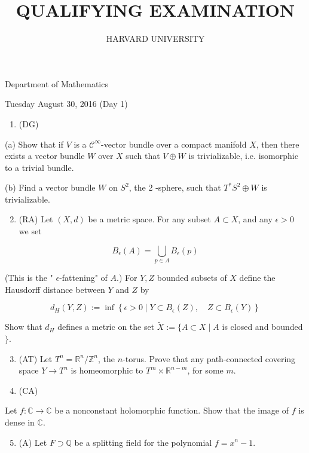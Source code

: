 \documentclass[10pt]{article}
\title{QUALIFYING EXAMINATION }
\author{HARVARD UNIVERSITY}
\date{}
\begin{document}
\maketitle
Department of Mathematics

Tuesday August 30, 2016 (Day 1)

\begin{enumerate}
  \item (DG)
\end{enumerate}

(a) Show that if $V$ is a $\mathcal{C}^{\infty}$-vector bundle over a compact manifold $X$, then there exists a vector bundle $W$ over $X$ such that $V \oplus W$ is trivializable, i.e. isomorphic to a trivial bundle.

(b) Find a vector bundle $W$ on $S^{2}$, the 2 -sphere, such that $T^{*} S^{2} \oplus W$ is trivializable.

\begin{enumerate}
  \setcounter{enumi}{1}
  \item (RA) Let $(X, d)$ be a metric space. For any subset $A \subset X$, and any $\epsilon>0$ we set
\end{enumerate}

$$
B_{\epsilon}(A)=\bigcup_{p \in A} B_{\epsilon}(p)
$$

(This is the " $\epsilon$-fattening" of $A$.) For $Y, Z$ bounded subsets of $X$ define the Hausdorff distance between $Y$ and $Z$ by

$$
d_{H}(Y, Z):=\inf \left\{\epsilon>0 \mid Y \subset B_{\epsilon}(Z), \quad Z \subset B_{\epsilon}(Y)\right\}
$$

Show that $d_{H}$ defines a metric on the set $\tilde{X}:=\{A \subset X \mid A$ is closed and bounded $\}$.

\begin{enumerate}
  \setcounter{enumi}{2}
  \item (AT) Let $T^{n}=\mathbb{R}^{n} / \mathbb{Z}^{n}$, the $n$-torus. Prove that any path-connected covering space $Y \rightarrow T^{n}$ is homeomorphic to $T^{m} \times \mathbb{R}^{n-m}$, for some $m$.

  \item (CA)

\end{enumerate}

Let $f: \mathbb{C} \rightarrow \mathbb{C}$ be a nonconstant holomorphic function. Show that the image of $f$ is dense in $\mathbb{C}$.

\begin{enumerate}
  \setcounter{enumi}{4}
  \item (A) Let $F \supset \mathbb{Q}$ be a splitting field for the polynomial $f=x^{n}-1$.
\end{enumerate}
\end{document}
